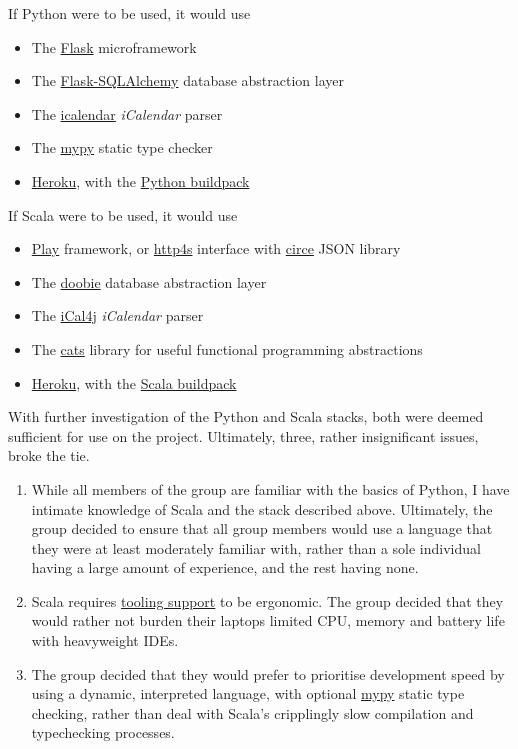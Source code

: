 \documentclass[11pt,a4paper]{report}
\begin{document}
If Python were to be used, it would use

\begin{itemize} 
    \item The \href{http://flask.pocoo.org/}{Flask} microframework
    \item The \href{http://flask-sqlalchemy.pocoo.org/2.1/}{Flask-SQLAlchemy} database abstraction layer
    \item The \href{https://pypi.python.org/pypi/icalendar}{icalendar} \textit{iCalendar} parser
    \item The \href{http://mypy-lang.org/}{mypy} static type checker
    \item \href{https://www.heroku.com/}{Heroku}, with the \href{https://github.com/heroku/heroku-buildpack-python}{Python buildpack}
\end{itemize}


If Scala were to be used, it would use

\begin{itemize}
    \item \href{https://www.playframework.com/}{Play} framework, or \href{https://github.com/http4s/http4s}{http4s} interface with \href{https://github.com/circe/circe}{circe} JSON library
    \item The \href{https://github.com/tpolecat/doobie}{doobie} database abstraction layer
    \item The \href{https://github.com/ical4j/ical4j}{iCal4j} \textit{iCalendar} parser
    \item The \href{https://github.com/typelevel/cats}{cats} library for useful functional programming abstractions
    \item \href{https://www.heroku.com/}{Heroku}, with the \href{https://github.com/heroku/heroku-buildpack-scala}{Scala buildpack}
\end{itemize}


With further investigation of the Python and Scala stacks, both were deemed sufficient for use on the project. Ultimately, three, rather insignificant issues, broke the tie.

\begin{enumerate}
    \item While all members of the group are familiar with the basics of Python, I have intimate knowledge of Scala and the stack described above. Ultimately, the group decided to ensure that all group members would use a language that they were at least moderately familiar with, rather than a sole individual having a large amount of experience, and the rest having none.
    \item Scala requires \href{https://plugins.jetbrains.com/plugin/1347-scala}{tooling support} to be ergonomic. The group decided that they would rather not burden their laptops limited CPU, memory and battery life with heavyweight IDEs.
    \item The group decided that they would prefer to prioritise development speed by using a dynamic, interpreted language, with optional \href{http://mypy-lang.org/}{mypy} static type checking, rather than deal with Scala's cripplingly slow compilation and typechecking processes.
\end{enumerate}
\end{document}
